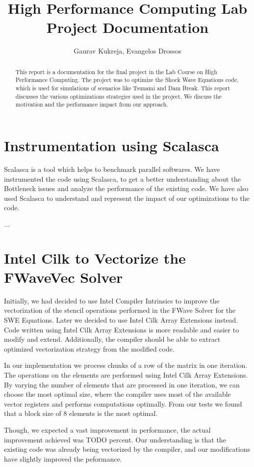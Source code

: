\documentclass[]{article}
\title{High Performance Computing Lab\\Project Documentation}
\author{Gaurav Kukreja, Evangelos Drossos}
\begin{document}
\maketitle

\begin{abstract}
This report is a documentation for the final project in the Lab Course on High Performance Computing. The
project was to optimize the Shock Wave Equations code, which is used for simulations of scenarios like
Tsunami and Dam Break. This report discusses the various optimizations strategies used in the project.
We discuss the motivation and the performance impact from our approach.
\end{abstract}

\section{Instrumentation using Scalasca}
Scalasca is a tool which helps to benchmark parallel softwares. We have instrumented the code using Scalasca,
to get a better understanding about the Bottleneck issues and analyze the performance of the existing code. We have also used Scalasca to understand and represent the impact of our optimizations to the code.

...

\section{Intel Cilk to Vectorize the FWaveVec Solver}
Initially, we had decided to use Intel Compiler Intrinsics to improve the vectorization of the stencil operations
performed in the FWave Solver for the SWE Equations. Later we decided to use Intel Cilk Array Extensions instead.
Code written using Intel Cilk Array Extensions is more readable and easier to modify and extend. Additionally, the
compiler should be able to extract optimized vectorization strategy from the modified code.

In our implementation we process chunks of a row of the matrix in one iteration. The operations on the elements are
performed using Intel Cilk Array Extensions. By varying the number of elements that are processed in one iteration,
we can choose the most optimal size, where the compiler uses most of the available vector registers and performs
computations optimally. From our tests we found that a block size of 8 elements is the most optimal.

Though, we expected a vast improvement in performance, the actual improvement achieved was TODO percent. Our
understanding is that the existing code was already being vectorized by the compiler, and our modifications have
slightly improved the peformance.
\end{document}
